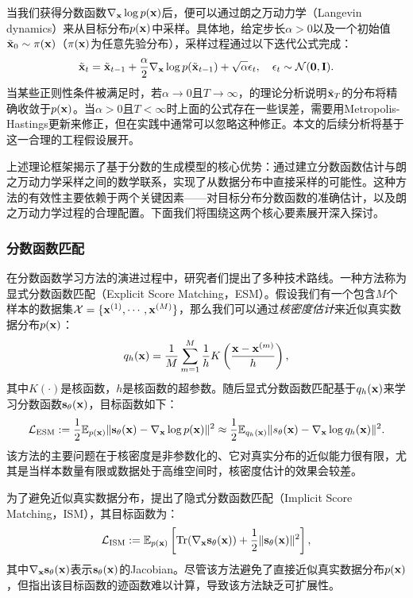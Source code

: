 \documentclass[11pt,a4paper,UTF8]{ctexart}
\begin{document}
当我们获得分数函数$\nabla_{\mathbf{x}}\log p(\mathbf{x})$后，便可以通过朗之万动力学（Langevin dynamics）来从目标分布$p(\mathbf{x})$中采样。具体地，给定步长$\alpha>0$以及一个初始值$\tilde{\mathbf{x}}_0\sim\pi(\mathbf{x})$（$\pi(\mathbf{x})$为任意先验分布），采样过程通过以下迭代公式完成：
\begin{equation*}
    \tilde{\mathbf{x}}_t = \tilde{\mathbf{x}}_{t-1} + \frac{\alpha}{2} \nabla_{\mathbf{x}}\log p(\tilde{\mathbf{x}}_{t-1}) + \sqrt{\alpha}\epsilon_t,\quad \epsilon_t\sim\mathcal{N}(\mathbf{0},\mathbf{I}).
\end{equation*}
当某些正则性条件被满足时，若$\alpha\rightarrow 0$且$T\rightarrow \infty$，\cite{max2011bayesian}的理论分析说明$\tilde{\mathbf{x}}_T$的分布将精确收敛于$p(\mathbf{x})$。当$\alpha> 0$且$T< \infty$时上面的公式存在一些误差，需要用Metropolis-Hastings更新来修正，但在实践中通常可以忽略这种修正\cite{du2019implicit,nijkamp2019anatomy}。本文的后续分析将基于这一合理的工程假设展开。

上述理论框架揭示了基于分数的生成模型的核心优势：通过建立分数函数估计与朗之万动力学采样之间的数学联系，实现了从数据分布中直接采样的可能性。这种方法的有效性主要依赖于两个关键因素——对目标分布分数函数的准确估计，以及朗之万动力学过程的合理配置。下面我们将围绕这两个核心要素展开深入探讨。

\subsubsection{分数函数匹配}

在分数函数学习方法的演进过程中，研究者们提出了多种技术路线。一种方法称为显式分数函数匹配（Explicit Score Matching，ESM）\cite{vincent2011connection}。假设我们有一个包含$M$个样本的数据集$\mathcal{X}=\{\mathbf{x}^{(1)},\cdots,\mathbf{x}^{(M)}\}$，那么我们可以通过\emph{核密度估计}来近似真实数据分布$p(\mathbf{x})$：
\begin{equation*}
    q_h(\mathbf{x})=\frac{1}{M}\sum_{m=1}^M \frac{1}{h} K\left(\frac{\mathbf{x}-\mathbf{x}^{(m)}}{h} \right),
\end{equation*}
其中$K(\cdot)$是核函数，$h$是核函数的超参数。随后显式分数函数匹配基于$q_h(\mathbf{x})$来学习分数函数$\mathbf{s}_\theta(\mathbf{x})$，目标函数如下：
\begin{equation*}
    \mathcal{L}_{\text{ESM}}:=\frac{1}{2}\mathbb{E}_{p(\mathbf{x})} \|\mathbf{s}_\theta(\mathbf{x})-\nabla_{\mathbf{x}}\log p(\mathbf{x}) \|^2 \approx \frac{1}{2}\mathbb{E}_{q_h(\mathbf{x})} \| s_\theta(\mathbf{x})-\nabla_{\mathbf{x}}\log q_h(\mathbf{x})\|^2.
\end{equation*}
该方法的主要问题在于核密度是非参数化的、它对真实分布的近似能力很有限，尤其是当样本数量有限或数据处于高维空间时，核密度估计的效果会较差。

为了避免近似真实数据分布，\cite{Hyvrinen2005EstimationON}提出了隐式分数函数匹配（Implicit Score Matching，ISM），其目标函数为：
\begin{equation*}
    \mathcal{L}_{\text{ISM}}:=\mathbb{E}_{p(\mathbf{x})} \left[\text{Tr}(\nabla_{\mathbf{x}} \mathbf{s}_\theta (\mathbf{x})) + \frac{1}{2}\|\mathbf{s}_\theta (\mathbf{x}) \|^2 \right],
\end{equation*}
其中$\nabla_{\mathbf{x}} \mathbf{s}_\theta (\mathbf{x})$表示$\mathbf{s}_\theta (\mathbf{x})$的Jacobian。尽管该方法避免了直接近似真实数据分布$p(\mathbf{x})$，但\cite{song2019generative}指出该目标函数的迹函数难以计算，导致该方法缺乏可扩展性。
\end{document}
